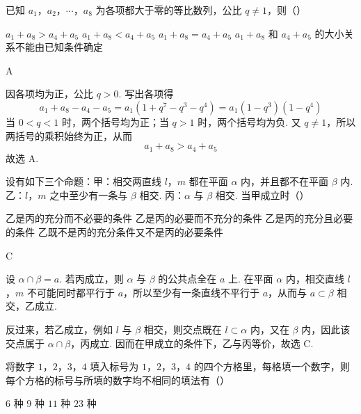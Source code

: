 \documentclass[UTF8,a4paper,oneside,11pt]{ctexbook}
\begin{document}
\begin{problem}
已知 \(a_1\)，\(a_2\)，\(\cdots\)，\(a_8\) 为各项都大于零的等比数列，公比 \(q\neq 1\)，则（\quad）

\choices
    {\(a_1+a_8>a_4+a_5\)}
    {\(a_1+a_8<a_4+a_5\)}
    {\(a_1+a_8=a_4+a_5\)}
    {\(a_1+a_8\) 和 \(a_4+a_5\) 的大小关系不能由已知条件确定}
\end{problem}

\begin{answer}
A
\end{answer}

\begin{solution}
因各项均为正，公比 \(q>0\). 写出各项得
\[
a_1+a_8-a_4-a_5
=a_1(1+q^7-q^3-q^4)
=a_1(1-q^3)(1-q^4)
\]
当 \(0<q<1\) 时，两个括号均为正；当 \(q>1\) 时，两个括号均为负. 又 \(q\neq1\)，所以两括号的乘积始终为正，从而
\[
a_1+a_8>a_4+a_5
\]
故选 A.
\end{solution}

\begin{problem}
设有如下三个命题：甲：相交两直线 \(l\)，\(m\) 都在平面 \(\alpha\) 内，并且都不在平面 \(\beta\) 内. 乙：\(l\)，\(m\) 之中至少有一条与 \(\beta\) 相交. 丙：\(\alpha\) 与 \(\beta\) 相交. 当甲成立时（\quad）

\choices
    {乙是丙的充分而不必要的条件}
    {乙是丙的必要而不充分的条件}
    {乙是丙的充分且必要的条件}
    {乙既不是丙的充分条件又不是丙的必要条件}
\end{problem}

\begin{answer}
C
\end{answer}

\begin{solution}
设 \(\alpha\cap\beta=a\). 若丙成立，则 \(\alpha\) 与 \(\beta\) 的公共点全在 \(a\) 上. 在平面 \(\alpha\) 内，相交直线 \(l\)，\(m\) 不可能同时都平行于 \(a\)，所以至少有一条直线不平行于 \(a\)，从而与 \(a\subset\beta\) 相交，乙成立.

反过来，若乙成立，例如 \(l\) 与 \(\beta\) 相交，则交点既在 \(l\subset\alpha\) 内，又在 \(\beta\) 内，因此该交点属于 \(\alpha\cap\beta\)，丙成立. 因而在甲成立的条件下，乙与丙等价，故选 C.
\end{solution}

\begin{problem}
将数字 \(1\)，\(2\)，\(3\)，\(4\) 填入标号为 \(1\)，\(2\)，\(3\)，\(4\) 的四个方格里，每格填一个数字，则每个方格的标号与所填的数字均不相同的填法有（\quad）

\choices
    {\(6\) 种}
    {\(9\) 种}
    {\(11\) 种}
    {\(23\) 种}
\end{problem}
\end{document}
